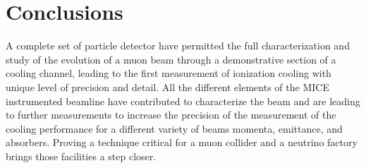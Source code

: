 \graphicspath{{80-Conclusions/Figures/}}

\section{Conclusions}
\label{Sect:Conclusions}

A complete set of particle detector have permitted the full characterization and study of the evolution of a muon beam through a demonstrative section of a cooling channel, leading to the first measurement of ionization cooling with unique level of precision and detail.
All the different elements of the MICE instrumented beamline have contributed to characterize the beam and are leading to further measurements to increase the precision of the measurement of the cooling performance for a different variety of beams momenta, emittance, and absorbers.
Proving a technique critical for a muon collider and a neutrino factory brings those facilities a step closer.
